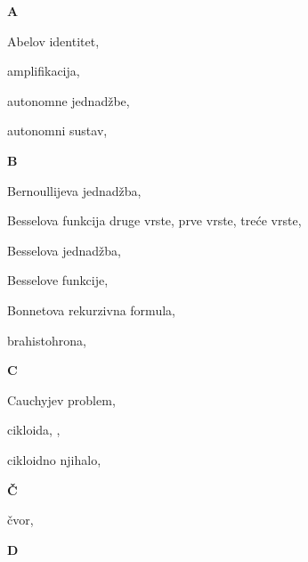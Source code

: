 \begin{theindex}

{\bfseries\hfil A\hfil}\nopagebreak

  \item Abelov identitet, 
  \item amplifikacija, 
  \item autonomne jednad\v zbe, 
  \item autonomni sustav, 

  \indexspace
{\bfseries\hfil B\hfil}\nopagebreak

  \item Bernoullijeva jednad\v zba, 
  \item Besselova funkcija
    \subitem druge vrste, 
    \subitem prve vrste, 
    \subitem tre\'ce vrste, 
  \item Besselova jednad\v zba, 
  \item Besselove funkcije, 
  \item Bonnetova rekurzivna formula, 
  \item brahistohrona, 

  \indexspace
{\bfseries\hfil C\hfil}\nopagebreak

  \item Cauchyjev problem, 
  \item cikloida, , 
  \item cikloidno njihalo, 

  \indexspace
  
  {\bfseries\hfil \v C\hfil}\nopagebreak

  \item \v cvor, 

  \indexspace
  
{\bfseries\hfil D\hfil}\nopagebreak


\end{theindex}

